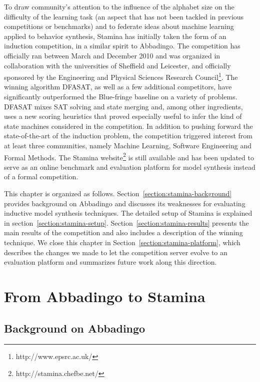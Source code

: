 To draw community's attention to the influence of the alphabet size on the difficulty of the learning task (an aspect that has not been tackled in previous competitions or benchmarks) and to federate ideas about machine learning applied to behavior synthesis, Stamina has initially taken the form of an induction competition, in a similar spirit to Abbadingo. The competition has officially ran between March and December 2010 and was organized in collaboration with the universities of Sheffield and Leicester, and officially sponsored by the Engineering and Physical Sciences Research Council\footnote{http://www.epsrc.ac.uk/}. The winning algorithm DFASAT, as well as a few additional competitors, have significantly outperformed the Blue-fringe baseline on a variety of problems. DFASAT mixes SAT solving and state merging and, among other ingredients, uses a new scoring heuristics that proved especially useful to infer the kind of state machines considered in the competition. In addition to pushing forward the state-of-the-art of the induction problem, the competition triggered interest from at least three communities, namely Machine Learning, Software Engineering and Formal Methods. The Stamina website\footnote{http://stamina.chefbe.net/} is still available and has been updated to serve as an online benchmark and evaluation platform for model synthesis instead of a formal competition.

This chapter is organized as follows. Section~\ref{section:stamina-background} provides background on Abbadingo and discusses its weaknesses for evaluating inductive model synthesis techniques. The detailed setup of Stamina is explained in section~\ref{section:stamina-setup}. Section~\ref{section:stamina-results} presents the main results of the competition and also includes a description of the winning technique. We close this chapter in Section~\ref{section:stamina-platform}, which describes the changes we made to let the competition server evolve to an evaluation platform and summarizes future work along this direction.

\section{From Abbadingo to Stamina\label{section:stamina-background}}

\subsection{Background on Abbadingo}


